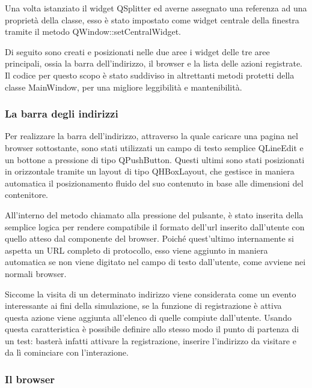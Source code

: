\documentclass[12pt]{toptesi}
\begin{document}
Una volta istanziato il widget QSplitter ed averne assegnato una referenza ad una proprietà della classe, esso è stato impostato come widget centrale della finestra tramite il metodo QWindow::setCentralWidget. 



Di seguito sono creati e posizionati nelle due aree i widget delle tre aree principali, ossia la barra dell'indirizzo, il browser e la lista delle azioni registrate. Il codice per questo scopo è stato suddiviso in altrettanti metodi protetti della classe MainWindow, per una migliore leggibilità e mantenibilità. 

\subsubsection{La barra degli indirizzi}

Per realizzare la barra dell'indirizzo, attraverso la quale caricare una pagina nel browser sottostante, sono stati utilizzati un campo di testo semplice QLineEdit e un bottone a pressione di tipo QPushButton. Questi ultimi sono stati posizionati in orizzontale tramite un layout di tipo QHBoxLayout, che gestisce in maniera automatica il posizionamento fluido del suo contenuto in base alle dimensioni del contenitore.

All'interno del metodo chiamato alla pressione del pulsante, è stato inserita della semplice logica per rendere compatibile il formato dell'url inserito dall'utente con quello atteso dal componente del browser. Poiché quest'ultimo internamente si aspetta un URL completo di protocollo, esso viene aggiunto in maniera automatica se non viene digitato nel campo di testo dall'utente, come avviene nei normali browser.

Siccome la visita di un determinato indirizzo viene considerata come un evento interessante ai fini della simulazione, se la funzione di registrazione è attiva questa azione viene aggiunta all'elenco di quelle compiute dall'utente. Usando questa caratteristica è possibile definire allo stesso modo il punto di partenza di un test: basterà infatti attivare la registrazione, inserire l'indirizzo da visitare e da lì cominciare con l'interazione.

\subsubsection{Il browser}
\end{document}
